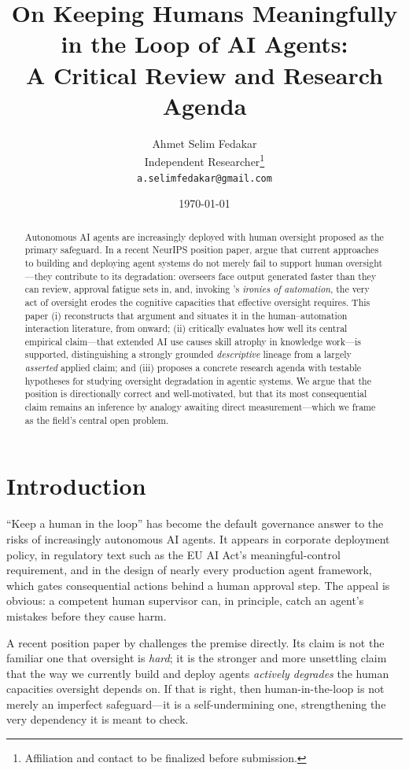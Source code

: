 \documentclass[11pt]{article}
\title{\textbf{On Keeping Humans Meaningfully in the Loop of AI Agents:\\
A Critical Review and Research Agenda}}
\author{%
  Ahmet Selim Fedakar\\
  \small Independent Researcher\thanks{Affiliation and contact to be finalized before submission. \todo{set affiliation}}\\
  \small \texttt{a.selimfedakar@gmail.com}%
}
\date{\today}
\begin{document}
\maketitle

\begin{abstract}
\noindent
Autonomous AI agents are increasingly deployed with human oversight proposed as the
primary safeguard. In a recent NeurIPS position paper, \citet{mitchell2026agents} argue
that current approaches to building and deploying agent systems do not merely fail to
support human oversight---they contribute to its degradation: overseers face output
generated faster than they can review, approval fatigue sets in, and, invoking
\citeauthor{bainbridge1983}'s \emph{ironies of automation}, the very act of oversight
erodes the cognitive capacities that effective oversight requires. This paper (i)
reconstructs that argument and situates it in the human--automation interaction
literature, from \citeyear{bainbridge1983} onward; (ii) critically evaluates how well its
central empirical claim---that extended AI use causes skill atrophy in knowledge work---is
supported, distinguishing a strongly grounded \emph{descriptive} lineage from a largely
\emph{asserted} applied claim; and (iii) proposes a concrete research agenda with testable
hypotheses for studying oversight degradation in agentic systems. We argue that the
position is directionally correct and well-motivated, but that its most consequential
claim remains an inference by analogy awaiting direct measurement---which we frame as the
field's central open problem.
\end{abstract}

\section{Introduction}
\label{sec:intro}

``Keep a human in the loop'' has become the default governance answer to the risks of
increasingly autonomous AI agents. It appears in corporate deployment policy, in
regulatory text such as the EU AI Act's meaningful-control requirement, and in the design
of nearly every production agent framework, which gates consequential actions behind a
human approval step. The appeal is obvious: a competent human supervisor can, in
principle, catch an agent's mistakes before they cause harm.

A recent position paper by \citet{mitchell2026agents} challenges the premise directly. Its
claim is not the familiar one that oversight is \emph{hard}; it is the stronger and more
unsettling claim that the way we currently build and deploy agents \emph{actively degrades}
the human capacities oversight depends on. If that is right, then human-in-the-loop is not
merely an imperfect safeguard---it is a self-undermining one, strengthening the very
dependency it is meant to check.
\end{document}
